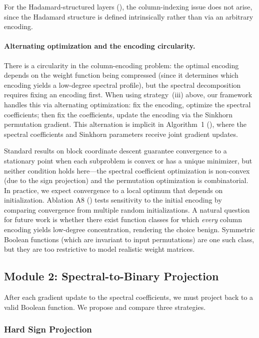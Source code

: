 \documentclass[12pt,a4paper]{article}
\theoremstyle{plain}
\theoremstyle{definition}
\theoremstyle{remark}
\begin{document}
For the Hadamard-structured layers (), the column-indexing issue does not arise, since the Hadamard structure is defined intrinsically rather than via an arbitrary encoding.

\paragraph{Alternating optimization and the encoding circularity.}
There is a circularity in the column-encoding problem: the optimal encoding depends on the weight function being compressed (since it determines which encoding yields a low-degree spectral profile), but the spectral decomposition requires fixing an encoding first.
When using strategy~(iii) above, our framework handles this via alternating optimization: fix the encoding, optimize the spectral coefficients; then fix the coefficients, update the encoding via the Sinkhorn permutation gradient.
This alternation is implicit in Algorithm~1 (), where the spectral coefficients and Sinkhorn parameters receive joint gradient updates.

Standard results on block coordinate descent guarantee convergence to a stationary point when each subproblem is convex or has a unique minimizer, but neither condition holds here---the spectral coefficient optimization is non-convex (due to the sign projection) and the permutation optimization is combinatorial.
In practice, we expect convergence to a local optimum that depends on initialization.
Ablation A8 () tests sensitivity to the initial encoding by comparing convergence from multiple random initializations.
A natural question for future work is whether there exist function classes for which \emph{every} column encoding yields low-degree concentration, rendering the choice benign.
Symmetric Boolean functions (which are invariant to input permutations) are one such class, but they are too restrictive to model realistic weight matrices.


\subsection{Module 2: Spectral-to-Binary Projection}\label{sec:projection}

After each gradient update to the spectral coefficients, we must project back to a valid Boolean function. We propose and compare three strategies.

\subsubsection{Hard Sign Projection}\label{sec:hard-sign}
\end{document}
